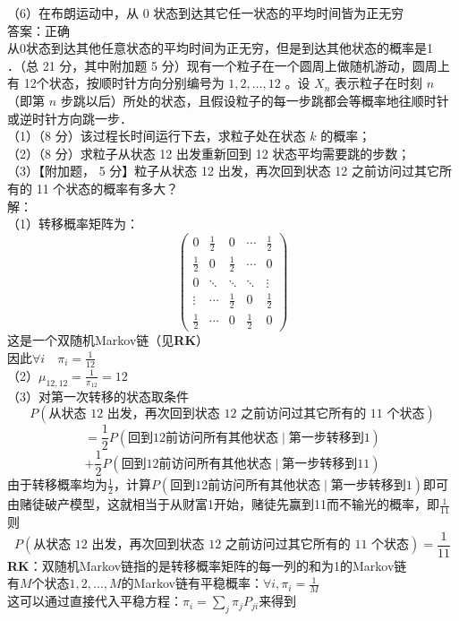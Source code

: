 \documentclass[UTF8]{ctexart}
\begin{document}
\noindent （6）在布朗运动中，从 0 状态到达其它任一状态的平均时间皆为正无穷\\
答案：正确\\
从0状态到达其他任意状态的平均时间为正无穷，但是到达其他状态的概率是1\\


．（总 21 分，其中附加题 5 分）现有一个粒子在一个圆周上做随机游动，圆周上有 12个状态，按顺时针方向分别编号为 $1,2, \ldots, 12$ 。设 $X_{n}$ 表示粒子在时刻 $n$（即第 $n$ 步跳以后）所处的状态，且假设粒子的每一步跳都会等概率地往顺时针或逆时针方向跳一步．\\
（1）（8 分）该过程长时间运行下去，求粒子处在状态 $k$ 的概率；\\
（2）（8 分）求粒子从状态 12 出发重新回到 12 状态平均需要跳的步数；\\
（3）【附加题， 5 分】粒子从状态 12 出发，再次回到状态 12 之前访问过其它所有的 11 个状态的概率有多大？\\
解：\\
（1）转移概率矩阵为：\\
\[
\begin{pmatrix}
	0 & \frac{1}{2} & 0      & \cdots & \frac{1}{2} \\
	\frac{1}{2} & 0 & \frac{1}{2} & \cdots & 0 \\
	0      & \ddots & \ddots & \ddots & \vdots \\
	\vdots & \cdots & \frac{1}{2}& 0 & \frac{1}{2}\\
	\frac{1}{2}      & \cdots & 0      & \frac{1}{2}& 0
\end{pmatrix}
\]
这是一个双随机Markov链（见\textbf{RK}）\\
因此$\forall i \quad \pi_i=\frac{1}{12}$\\
（2）$\mu_{12,12}=\frac{1}{\pi_{12}}=12$\\
（3）对第一次转移的状态取条件\\
\[
	P(\text{从状态 12 出发，再次回到状态 12 之前访问过其它所有的 11 个状态}) 
\]
\[
	= \frac{1}{2}P(\text{回到12前访问所有其他状态} \mid \text{第一步转移到1}) 
\]
\[
	+ \frac{1}{2}P(\text{回到12前访问所有其他状态} \mid \text{第一步转移到11})
\]
由于转移概率均为$\frac{1}{2}$，计算$P(\text{回到12前访问所有其他状态} \mid \text{第一步转移到1})$即可\\
由赌徒破产模型，这就相当于从财富1开始，赌徒先赢到11而不输光的概率，即$\frac{1}{11}$\\
则
\[
P(\text{从状态 12 出发，再次回到状态 12 之前访问过其它所有的 11 个状态}) =\frac{1}{11}
\]
\textbf{RK}：双随机Markov链指的是转移概率矩阵的每一列的和为1的Markov链\\
有$M$个状态$1,2,...,M$的Markov链有平稳概率：$\forall i,\pi_i=\frac{1}{M}$\\
这可以通过直接代入平稳方程：$\pi_i=\sum\limits_{j}^{}\pi_j P_{ji}$来得到\\
\end{document}
